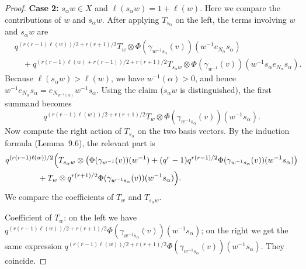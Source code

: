 \documentclass[12pt]{article}
\theoremstyle{remark}
\begin{document}
\begin{proof}
\noindent\textbf{Case 2:} $s_\alpha w \in X$ and $\ell(s_\alpha w) = 1 + \ell(w)$.
Here we compare the contributions of $w$ and $s_\alpha w$. After applying $T_{s_\alpha}$ on the left, the terms involving $w$ and $s_\alpha w$ are
\begin{align*}
& q^{(r(r-1)\ell(w))/2 + r(r+1)/2} T_w \otimes \Phi(\gamma_{w^{-1}s_\alpha}(v))(w^{-1} e_{N_\alpha} s_\alpha) \\
&\quad + q^{(r(r-1)\ell(w) + r(r-1))/2 + r(r+1)/2} T_{s_\alpha w} \otimes \Phi(\gamma_{w^{-1}}(v))(w^{-1} s_\alpha e_{N_\alpha} s_\alpha).
\end{align*}
Because $\ell(s_\alpha w) > \ell(w)$, we have $w^{-1}(\alpha) > 0$, and hence $w^{-1} e_{N_\alpha} s_\alpha = e_{N_{w^{-1}(\alpha)}} w^{-1} s_\alpha$. Using the claim ($s_\alpha w$ is distinguished), the first summand becomes
$$
q^{(r(r-1)\ell(w))/2 + r(r+1)/2} T_w \otimes \Phi(\gamma_{w^{-1}s_\alpha}(v))(w^{-1} s_\alpha).
$$
Now compute the right action of $T_{s_\alpha}$ on the two basis vectors. By the induction formula (Lemma~9.6), the relevant part is
\begin{align*}
& q^{(r(r-1)\ell(w))/2} \Bigl( T_{s_\alpha w} \otimes \bigl( \Phi(\gamma_{w^{-1}}(v))(w^{-1}) + (q^r-1) q^{r(r-1)/2} \Phi(\gamma_{w^{-1}s_\alpha}(v))(w^{-1} s_\alpha) \bigr) \\
&\qquad\qquad + T_w \otimes q^{r(r+1)/2} \Phi(\gamma_{w^{-1}s_\alpha}(v))(w^{-1} s_\alpha) \Bigr).
\end{align*}
We compare the coefficients of $T_w$ and $T_{s_\alpha w}$.

\noindent Coefficient of $T_w$: on the left we have $q^{(r(r-1)\ell(w))/2 + r(r+1)/2} \Phi(\gamma_{w^{-1}s_\alpha}(v))(w^{-1} s_\alpha)$; on the right we get the same expression $q^{(r(r-1)\ell(w))/2 + r(r+1)/2} \Phi(\gamma_{w^{-1}s_\alpha}(v))(w^{-1} s_\alpha)$. They coincide.


\end{proof}
\end{document}

